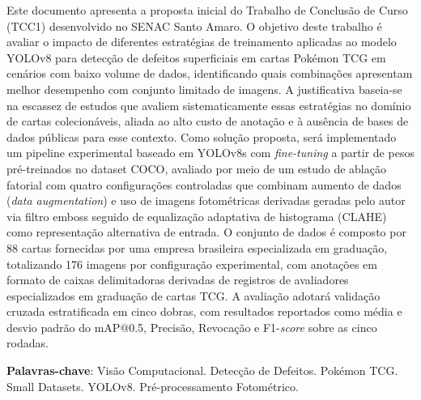 \documentclass[
    12pt,                %
    openright,           %
    oneside,             %
    a4paper,             %
    english,             %
    brazil               %
]{abntex2}
\begin{document}

\frenchspacing

\pretextual

\imprimircapa

\imprimirfolhaderosto

\begin{resumo}
Este documento apresenta a proposta inicial do Trabalho de Conclusão 
de Curso (TCC1) desenvolvido no SENAC Santo Amaro. O objetivo deste 
trabalho é avaliar o impacto de diferentes estratégias de treinamento 
aplicadas ao modelo YOLOv8 para detecção de defeitos superficiais em 
cartas Pokémon TCG em cenários com baixo volume de dados, identificando 
quais combinações apresentam melhor desempenho com conjunto
limitado de imagens. A justificativa baseia-se na 
escassez de estudos que avaliem sistematicamente essas estratégias no 
domínio de cartas colecionáveis, aliada ao alto custo de anotação e à 
ausência de bases de dados públicas para esse contexto. Como solução 
proposta, será implementado um pipeline experimental baseado em 
YOLOv8s com \textit{fine-tuning} a partir de pesos pré-treinados no 
dataset COCO, avaliado por meio de um estudo de ablação fatorial com 
quatro configurações controladas que combinam aumento de dados 
(\textit{data augmentation}) e uso de imagens fotométricas derivadas 
geradas pelo autor via filtro emboss seguido de equalização 
adaptativa de histograma (CLAHE) como representação alternativa de 
entrada. O conjunto de dados é composto por 88 cartas fornecidas por 
uma empresa brasileira especializada em graduação, totalizando 176 
imagens por configuração experimental, com anotações em formato de caixas delimitadoras derivadas 
de registros de avaliadores especializados em graduação de cartas TCG. A avaliação adotará validação cruzada 
estratificada em cinco dobras, com resultados reportados como média e 
desvio padrão do mAP@0.5, Precisão, Revocação e F1-\textit{score} 
sobre as cinco rodadas.

\vspace{\onelineskip}

\noindent
\textbf{Palavras-chave}: Visão Computacional. Detecção de Defeitos. 
Pokémon TCG. Small Datasets. YOLOv8. Pré-processamento Fotométrico.
\end{resumo}
\end{document}

